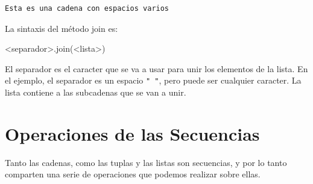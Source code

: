 \documentclass[
  letterpaper,
  DIV=11,
  numbers=noendperiod]{scrreprt}
\newenvironment{Shaded}{\begin{snugshade}}{\end{snugshade}}
\newcommand{\NormalTok}[1]{\textcolor[rgb]{0.00,0.23,0.31}{#1}}
\newcommand{\OperatorTok}[1]{\textcolor[rgb]{0.37,0.37,0.37}{#1}}
\begin{document}
\begin{verbatim}
Esta es una cadena con espacios varios
\end{verbatim}

La sintaxis del método join es:

\begin{Shaded}
\begin{Highlighting}[]
\OperatorTok{\textless{}}\NormalTok{separador}\OperatorTok{\textgreater{}}\NormalTok{.join(}\OperatorTok{\textless{}}\NormalTok{lista}\OperatorTok{\textgreater{}}\NormalTok{)}
\end{Highlighting}
\end{Shaded}

El separador es el caracter que se va a usar para unir los elementos de
la lista. En el ejemplo, el separador es un espacio \texttt{"\ "}, pero
puede ser cualquier caracter. La lista contiene a las subcadenas que se
van a unir.

\section{Operaciones de las
Secuencias}\label{operaciones-de-las-secuencias}

Tanto las cadenas, como las tuplas y las listas son secuencias, y por lo
tanto comparten una serie de operaciones que podemos realizar sobre
ellas.
\end{document}

